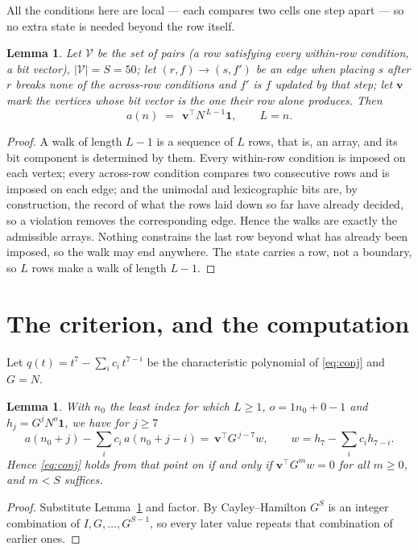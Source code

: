 \documentclass[11pt,a4paper]{article}
\theoremstyle{plain}
\newtheorem{lemma}[theorem]{Lemma}
\theoremstyle{definition}
\begin{document}
All the conditions here are local --- each compares two cells one step apart ---
so no extra state is needed beyond the row itself.

\begin{lemma}\label{lem:walk}
Let $\mathcal V$ be the set of pairs (a row satisfying every within-row condition, a
bit vector), $|\mathcal V|=S=50$; let $(r,f)\to(s,f')$ be an edge when placing $s$ after $r$
breaks none of the across-row conditions and $f'$ is $f$ updated by that step; let
$\mathbf{v}$ mark the vertices whose bit vector is the one their row alone produces.
Then
\[
a(n)\;=\;\,\mathbf{v}^{\!\top}N^{\,L-1}\mathbf{1},\qquad L=n.
\]
\end{lemma}

\begin{proof}
A walk of length $L-1$ is a sequence of $L$ rows, that is, an array, and its bit component
is determined by them. Every within-row condition is imposed on each vertex; every
across-row condition compares two consecutive rows and is imposed on each edge; and the
unimodal and lexicographic bits are, by construction, the record of what the rows laid down
so far have already decided, so a violation removes the corresponding edge. Hence the walks
are exactly the admissible arrays. Nothing constrains the last row beyond what has already
been imposed, so the walk may end anywhere. The state carries a row, not a boundary, so
$L$ rows make a walk of length $L-1$.
\end{proof}

\section{The criterion, and the computation}

Let $q(t)=t^{7}-\sum_i c_i\,t^{7-i}$ be the characteristic polynomial of
\eqref{eq:conj} and $G=N$.

\begin{lemma}\label{lem:crit}
With $n_0$ the least index for which $L\ge1$, $o=1n_0+0-1$ and
$h_j=G^{j}N^{o}\mathbf{1}$, we have for $j\ge7$
\[
a(n_0+j)-\sum_i c_i\,a(n_0+j-i)=\,\mathbf{v}^{\!\top}G^{\,j-7}w,
\qquad w=h_{7}-\sum_i c_ih_{7-i} .
\]
Hence \eqref{eq:conj} holds from that point on if and only if
$\mathbf{v}^{\!\top}G^{m}w=0$ for all $m\ge0$, and $m<S$ suffices.
\end{lemma}

\begin{proof}
Substitute Lemma~\ref{lem:walk} and factor. By Cayley--Hamilton $G^{S}$ is an integer
combination of $I,G,\dots,G^{S-1}$, so every later value repeats that combination of
earlier ones.
\end{proof}
\end{document}
